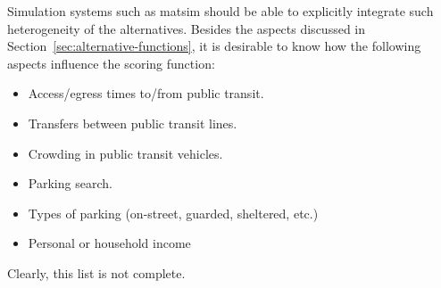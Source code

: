 Simulation systems such as \gls{matsim} should be able to explicitly integrate such heterogeneity of the alternatives.  Besides the aspects discussed in Section~\ref{sec:alternative-functions}, it is desirable to know how the following aspects influence the scoring function:
\begin{itemize}

\item Access/egress times to/from public transit.

\item Transfers between public transit lines.

\item Crowding in public transit vehicles.

\item Parking search.

\item Types of parking (on-street, guarded, sheltered, etc.)

\item Personal or household income

\end{itemize}
Clearly, this list is not complete.

